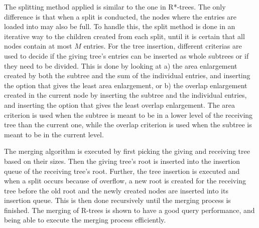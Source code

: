 The splitting method applied is similar to the one in R*-trees. The only difference is that when a split is conducted, the nodes where the entries are loaded into may also be full. To handle this, the split method is done in an iterative way to the children created from each split, until it is certain that all nodes contain at most $M$ entries. For the tree insertion, different criterias are used to decide if the giving tree's entries can be inserted as whole subtrees or if they need to be divided. This is done by looking at a) the area enlargement created by both the subtree and the sum of the individual entries, and inserting the option that gives the least area enlargement, or b) the overlap enlargement created in the current node by inserting the subtree and the individual entries, and inserting the option that gives the least overlap enlargement. The area criterion is used when the subtree is meant to be in a lower level of the receiving tree than the current one, while the overlap criterion is used when the subtree is meant to be in the current level.\newline

The merging algorithm is executed by first picking the giving and receiving tree based on their sizes. Then the giving tree's root is inserted into the insertion queue of the receiving tree's root. Further, the tree insertion is executed and when a split occurs because of overflow, a new root is created for the receiving tree before the old root and the newly created nodes are inserted into its insertion queue. This is then done recursively until the merging process is finished. The merging of R-trees is shown to have a good query performance, and being able to execute the merging process efficiently\cite{MergingRtree}.